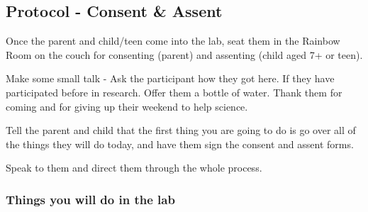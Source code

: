 \documentclass[]{book}
\begin{document}
\hypertarget{protocol---consent-assent}{%
\subsection{Protocol - Consent \& Assent}\label{protocol---consent-assent}}

Once the parent and child/teen come into the lab, seat them in the Rainbow Room on the couch for consenting (parent) and assenting (child aged 7+ or teen).

Make some small talk - Ask the participant how they got here. If they have participated before in research. Offer them a bottle of water. Thank them for coming and for giving up their weekend to help science.

Tell the parent and child that the first thing you are going to do is go over all of the things they will do today, and have them sign the consent and assent forms.

Speak to them and direct them through the whole process.

\hypertarget{things-you-will-do-in-the-lab}{%
\subsubsection{Things you will do in the lab}\label{things-you-will-do-in-the-lab}}
\end{document}
